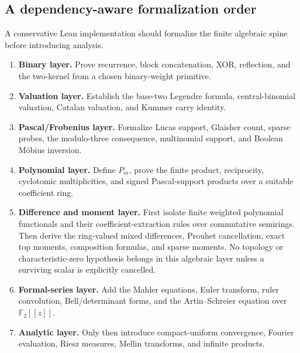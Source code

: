\documentclass[11pt,oneside]{article}
\numberwithin{equation}{section}
\theoremstyle{definition}
\theoremstyle{remark}
\newcommand{\Ftwo}{\mathbb F_2}
\begin{document}
\subsection{A dependency-aware formalization order}
\label{p1:sec:formalization-order}

A conservative Lean implementation should formalize the finite algebraic
spine before introducing analysis.

\begin{enumerate}
\item \textbf{Binary layer.}  Prove recurrence, block concatenation, XOR,
      reflection, and the two-kernel from a chosen binary-weight primitive.
\item \textbf{Valuation layer.}  Establish the base-two Legendre formula,
      central-binomial valuation, Catalan valuation, and Kummer carry identity.
\item \textbf{Pascal/Frobenius layer.}  Formalize Lucas support, Glaisher count,
      sparse probes, the modulo-three consequence, multinomial support, and
      Boolean M\"obius inversion.
\item \textbf{Polynomial layer.}  Define \(P_m\), prove the finite product,
      reciprocity, cyclotomic multiplicities, and signed Pascal-support
      products over a suitable coefficient ring.
\item \textbf{Difference and moment layer.}  First isolate finite weighted
      polynomial functionals and their coefficient-extraction rules over
      commutative semirings.  Then derive the ring-valued mixed differences,
      Prouhet cancellation, exact top moments, composition formulas, and sparse
      moments.  No topology or characteristic-zero hypothesis belongs in this
      algebraic layer unless a surviving scalar is explicitly cancelled.
\item \textbf{Formal-series layer.}  Add the Mahler equations, Euler transform,
      ruler convolution, Bell/determinant forms, and the Artin--Schreier
      equation over \(\Ftwo[[z]]\).
\item \textbf{Analytic layer.}  Only then introduce compact-uniform convergence,
      Fourier evaluation, Riesz measures, Mellin transforms, and infinite
      products.
\end{enumerate}
\end{document}
